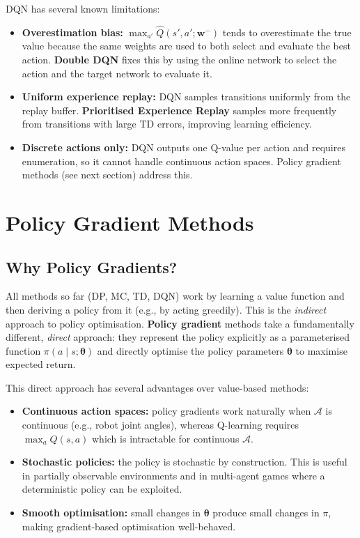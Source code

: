 \documentclass[11pt,a4paper]{article}
\newcommand{\term}[1]{\textcolor{DefGreen}{\textbf{#1}}}
\begin{document}
DQN has several known limitations:
\begin{itemize}
  \item \textbf{Overestimation bias:} $\max_{a'} \hat{Q}(s',a';\mathbf{w}^-)$ tends to overestimate the true value because the same weights are used to both select and evaluate the best action. \textbf{Double DQN} fixes this by using the online network to select the action and the target network to evaluate it.
  \item \textbf{Uniform experience replay:} DQN samples transitions uniformly from the replay buffer. \textbf{Prioritised Experience Replay} samples more frequently from transitions with large TD errors, improving learning efficiency.
  \item \textbf{Discrete actions only:} DQN outputs one Q-value per action and requires enumeration, so it cannot handle continuous action spaces. Policy gradient methods (see next section) address this.
\end{itemize}

\section{Policy Gradient Methods}

\subsection{Why Policy Gradients?}

All methods so far (DP, MC, TD, DQN) work by learning a value function and then deriving a policy from it (e.g., by acting greedily). This is the \emph{indirect} approach to policy optimisation. \term{Policy gradient} methods take a fundamentally different, \emph{direct} approach: they represent the policy explicitly as a parameterised function $\pi(a\mid s;\boldsymbol{\theta})$ and directly optimise the policy parameters $\boldsymbol{\theta}$ to maximise expected return.

This direct approach has several advantages over value-based methods:
\begin{itemize}
  \item \textbf{Continuous action spaces:} policy gradients work naturally when $\mathcal{A}$ is continuous (e.g., robot joint angles), whereas Q-learning requires $\max_a Q(s,a)$ which is intractable for continuous $\mathcal{A}$.
  \item \textbf{Stochastic policies:} the policy is stochastic by construction. This is useful in partially observable environments and in multi-agent games where a deterministic policy can be exploited.
  \item \textbf{Smooth optimisation:} small changes in $\boldsymbol{\theta}$ produce small changes in $\pi$, making gradient-based optimisation well-behaved.
\end{itemize}
\end{document}
